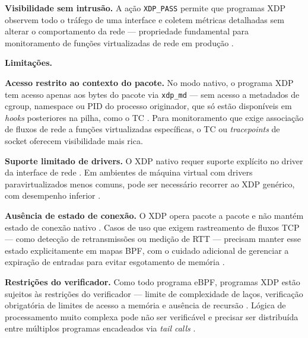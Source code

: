 \textbf{Visibilidade sem intrusão.}
A ação \texttt{XDP\_PASS} permite que programas XDP observem todo o tráfego de
uma interface e coletem métricas detalhadas sem alterar o comportamento da rede
--- propriedade fundamental para monitoramento de funções virtualizadas de rede
em produção \cite{venancio2021}.

\textbf{Limitações.}

\textbf{Acesso restrito ao contexto do pacote.}
No modo nativo, o programa XDP tem acesso apenas aos bytes do pacote via
\texttt{xdp\_md} --- sem acesso a metadados de cgroup, namespace ou PID do
processo originador, que só estão disponíveis em \textit{hooks} posteriores na
pilha, como o TC \cite{linuxkernel2024}.
Para monitoramento que exige associação de fluxos de rede a funções virtualizadas
específicas, o TC ou \textit{tracepoints} de socket oferecem visibilidade mais rica.

\textbf{Suporte limitado de drivers.}
O XDP nativo requer suporte explícito no driver da interface de rede
\cite{linuxkernel2024}.
Em ambientes de máquina virtual com drivers paravirtualizados menos comuns, pode
ser necessário recorrer ao XDP genérico, com desempenho inferior
\cite{gregg2020}.

\textbf{Ausência de estado de conexão.}
O XDP opera pacote a pacote e não mantém estado de conexão nativo
\cite{linuxkernel2024}.
Casos de uso que exigem rastreamento de fluxos TCP --- como detecção de
retransmissões ou medição de RTT --- precisam manter esse estado explicitamente
em mapas BPF, com o cuidado adicional de gerenciar a expiração de entradas para
evitar esgotamento de memória \cite{gregg2019}.

\textbf{Restrições do verificador.}
Como todo programa eBPF, programas XDP estão sujeitos às restrições do verificador
--- limite de complexidade de laços, verificação obrigatória de limites de acesso
a memória e ausência de recursão \cite{linuxkernel2024}.
Lógica de processamento muito complexa pode não ser verificável e precisar ser
distribuída entre múltiplos programas encadeados via \textit{tail calls}
\cite{gregg2019}.
